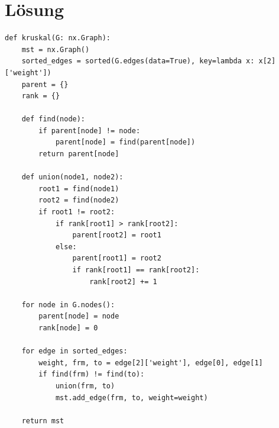 \documentclass[a4paper,11pt]{report}
\begin{document}
    \section{Lösung}

    \begin{verbatim}
def kruskal(G: nx.Graph):
    mst = nx.Graph()
    sorted_edges = sorted(G.edges(data=True), key=lambda x: x[2]['weight'])
    parent = {}
    rank = {}

    def find(node):
        if parent[node] != node:
            parent[node] = find(parent[node])
        return parent[node]

    def union(node1, node2):
        root1 = find(node1)
        root2 = find(node2)
        if root1 != root2:
            if rank[root1] > rank[root2]:
                parent[root2] = root1
            else:
                parent[root1] = root2
                if rank[root1] == rank[root2]:
                    rank[root2] += 1

    for node in G.nodes():
        parent[node] = node
        rank[node] = 0

    for edge in sorted_edges:
        weight, frm, to = edge[2]['weight'], edge[0], edge[1]
        if find(frm) != find(to):
            union(frm, to)
            mst.add_edge(frm, to, weight=weight)

    return mst
    \end{verbatim}
\end{document}
